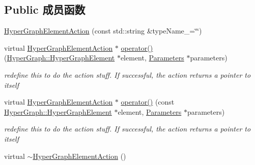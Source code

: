 \subsection*{Public 成员函数}
\begin{DoxyCompactItemize}
\item 
\hyperlink{classg2o_1_1HyperGraphElementAction_a1230bdd21f7c2b2c71e7206b59d81fd5}{Hyper\-Graph\-Element\-Action} (const std\-::string \&type\-Name\-\_\-=\char`\"{}\char`\"{})
\item 
\hypertarget{classg2o_1_1HyperGraphElementAction_a2faab4a1cdaf5fc010cb9c8627b7d361}{virtual \hyperlink{classg2o_1_1HyperGraphElementAction}{Hyper\-Graph\-Element\-Action} $\ast$ \hyperlink{classg2o_1_1HyperGraphElementAction_a2faab4a1cdaf5fc010cb9c8627b7d361}{operator()} (\hyperlink{structg2o_1_1HyperGraph_1_1HyperGraphElement}{Hyper\-Graph\-::\-Hyper\-Graph\-Element} $\ast$element, \hyperlink{structg2o_1_1HyperGraphElementAction_1_1Parameters}{Parameters} $\ast$parameters)}\label{classg2o_1_1HyperGraphElementAction_a2faab4a1cdaf5fc010cb9c8627b7d361}

\begin{DoxyCompactList}\small\item\em redefine this to do the action stuff. If successful, the action returns a pointer to itself \end{DoxyCompactList}\item 
\hypertarget{classg2o_1_1HyperGraphElementAction_a0dc2ff77e22791e32810d2c43b7154ad}{virtual \hyperlink{classg2o_1_1HyperGraphElementAction}{Hyper\-Graph\-Element\-Action} $\ast$ \hyperlink{classg2o_1_1HyperGraphElementAction_a0dc2ff77e22791e32810d2c43b7154ad}{operator()} (const \hyperlink{structg2o_1_1HyperGraph_1_1HyperGraphElement}{Hyper\-Graph\-::\-Hyper\-Graph\-Element} $\ast$element, \hyperlink{structg2o_1_1HyperGraphElementAction_1_1Parameters}{Parameters} $\ast$parameters)}\label{classg2o_1_1HyperGraphElementAction_a0dc2ff77e22791e32810d2c43b7154ad}

\begin{DoxyCompactList}\small\item\em redefine this to do the action stuff. If successful, the action returns a pointer to itself \end{DoxyCompactList}\item 
\hypertarget{classg2o_1_1HyperGraphElementAction_a01f7f7f2fb00018f2d0163a611f2f5da}{virtual \hyperlink{classg2o_1_1HyperGraphElementAction_a01f7f7f2fb00018f2d0163a611f2f5da}{$\sim$\-Hyper\-Graph\-Element\-Action} ()}\label{classg2o_1_1HyperGraphElementAction_a01f7f7f2fb00018f2d0163a611f2f5da}


\end{DoxyCompactItemize}
